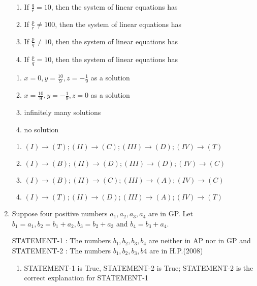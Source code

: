 \begin{enumerate}[label=\thesubsection.\arabic*,ref=\thesubsection.\theenumi]
		\begin{multicols}{2}
			\begin{enumerate}[label=(\Roman*)]		
\item     If $ \frac{q}{r} = 10 $, then the system of linear equations has 

\item      If $ \frac{p}{r} \neq 100 $, then the system of linear equations has 

\item      If $ \frac{p}{q} \neq 10 $, then the system of linear equations has 
\item      If $ \frac{p}{q} = 10 $, then the system of linear equations has 
\end{enumerate}
\columnbreak
					\begin{enumerate}[label=(\Alph*)]		
\item     $ x = 0,  y = \frac{10}{9}, z = -\frac{1}{9} $ as a solution  
\item     $ x = \frac{10}{9},  y = -\frac{1}{9},  z = 0 $ as a solution 
\item     infinitely many solutions                               
\item     no solution 
\end{enumerate}
                                         \end{multicols} 

\begin{enumerate}		
\item     $(I)\to(T);(II)\to(C);(III)\to(D);(IV)\to(T)$
\item     $(I)\to(B);(II)\to(D);(III)\to(D);(IV)\to(C)$   
\item     $(I)\to(B);(II)\to(C);(III)\to(A);(IV)\to(C)$
\item     $(I)\to(T);(II)\to(D);(III)\to(A);(IV)\to(T)$
\end{enumerate}
\item Suppose four positive numbers $a_{1},a_{2},a_{3},a_{4}$ are in GP. Let $b_{1} = a_{1}, b_{2} = b_{1} + a_{2}, b_{3} = b_{2} + a_{3}$ and $b_{4} = b_{3} + a_{4}$.

STATEMENT-1 : The numbers $b_{1},b_{2},b_{3},b_{4}$ are neither in AP nor in GP and STATEMENT-2 : The numbers $b_{1},b_{2},b_{3},b{4}$ are in H.P.\hfill(2008)

\begin{enumerate}
    

\item STATEMENT-1 is True, STATEMENT-2 is True; STATEMENT-2 is the correct explanation for STATEMENT-1


\end{enumerate}
\end{enumerate}
